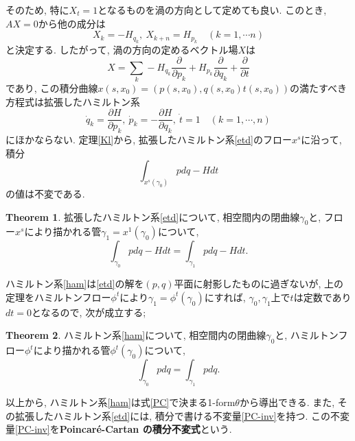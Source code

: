 \documentclass[a4paper]{ujarticle}
\numberwithin{equation}{section}
\theoremstyle{definition}
\newtheorem{theorem}{Theorem}
\begin{document}
    そのため, 特に$X_t = 1$となるものを渦の方向として定めても良い. このとき, $AX = 0$から他の成分は
    \[
        X_k = - H_{q_k}, \ X_{k+n} = H_{p_k} \quad (k = 1, \cdots n)
    \]
    と決定する.
    したがって, 渦の方向の定めるベクトル場$X$は
    \[
        X = \sum_{k} - H_{q_k} \frac{\partial}{\partial p_k} +  H_{p_k} \frac{\partial}{\partial q_k} + \frac{\partial}{\partial t}
    \]
    であり, この積分曲線$x(s, x_0) = (p(s, x_0), q(s, x_0) t(s, x_0))$の満たすべき方程式は拡張したハミルトン系
    \begin{equation} \label{etd}
        \dot{q}_k = \frac{\partial H}{\partial p_k}, \ \dot{p}_k = -\frac{\partial H}{\partial q_k},\  \dot{t} = 1 \quad (k = 1, \cdots, n)
    \end{equation}
    にほかならない. 
    定理\ref{Kl}から, 拡張したハミルトン系\eqref{etd}のフロー$x^s$に沿って, 積分
    \begin{equation} \label{PC-inv}
        \int_{x^{s}(\gamma_0)} p dq - H dt
    \end{equation}
    の値は不変である. 
    \begin{theorem} \label{PC-etd}
        拡張したハミルトン系\eqref{etd}について, 
        相空間内の閉曲線$\gamma_0$と, フロー$x^{s}$により描かれる管$\gamma_1 = x^{1}(\gamma_0)$について,
        \begin{equation} \label{eq:PC-inv}
            \int_{\gamma_0} p dq - H dt = \int_{\gamma_1} p dq - H dt.
        \end{equation}
    \end{theorem}
    ハミルトン系\eqref{ham}は\eqref{etd}の解を$(p, q)$平面に射影したものに過ぎないが, 
    上の定理をハミルトンフロー$\phi^{t}$により$\gamma_1 = \phi^{t}(\gamma_0)$にすれば, 
    $\gamma_0, \gamma_1$上で$t$は定数であり$dt = 0$となるので, 次が成立する;
    \begin{theorem} \label{PC-ham}
        ハミルトン系\eqref{ham}について, 
        相空間内の閉曲線$\gamma_0$と, ハミルトンフロー$\phi^{t}$により描かれる管$\phi^{t}(\gamma_0)$について,
        \begin{equation} \label{eq:P-inv}
            \int_{\gamma_0} p dq = \int_{\gamma_1} p dq.
        \end{equation}
    \end{theorem}
    
    以上から, ハミルトン系\eqref{ham}は式\eqref{PC}で決まる1-form$\theta$から導出できる.
    また, その拡張したハミルトン系\eqref{etd}には, 積分で書ける不変量\eqref{PC-inv}を持つ.
    この不変量\eqref{PC-inv}を\textbf{Poincar\'{e}-Cartan の積分不変式}という.
\end{document}

